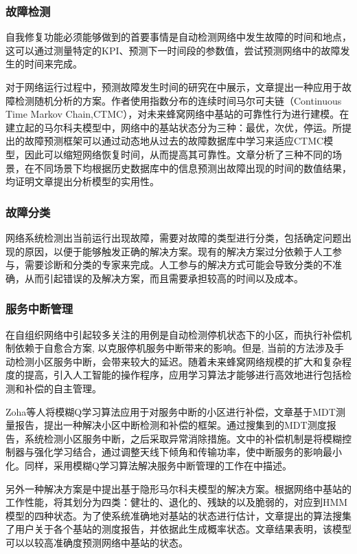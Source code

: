 \documentclass{IEEEtran}
\begin{document}
\subsubsection{故障检测}
自我修复功能必须能够做到的首要事情是自动检测网络中发生故障的时间和地点，这可以通过测量特定的KPI、预测下一时间段的参数值，尝试预测网络中的故障发生的时间来完成。

对于网络运行过程中，预测故障发生时间的研究在\cite{Farooq2015}中展示，文章提出一种应用于故障检测随机分析的方案。作者使用指数分布的连续时间马尔可夫链（Continuous Time Markov Chain,CTMC），对未来蜂窝网络中基站的可靠性行为进行建模。在建立起的马尔科夫模型中，网络中的基站状态分为三种：最优，次优，停运。所提出的故障预测框架可以通过动态地从过去的故障数据库中学习来适应CTMC模型，因此可以缩短网络恢复时间，从而提高其可靠性。文章分析了三种不同的场景，在不同场景下均根据历史数据库中的信息预测出故障出现的时间的数值结果，均证明文章提出分析模型的实用性。

\subsubsection{故障分类}

网络系统检测出当前运行出现故障，需要对故障的类型进行分类，包括确定问题出现的原因，以便于能够触发正确的解决方案。现有的解决方案过分依赖于人工参与，需要诊断和分类的专家来完成。人工参与的解决方式可能会导致分类的不准确，从而引起错误的及解决方案，而且需要承担较高的时间以及成本。


\subsubsection{服务中断管理}

在自组织网络中引起较多关注的用例是自动检测停机状态下的小区，而执行补偿机制依赖于自愈合方案, 以克服停机服务中断带来的影响。但是, 当前的方法涉及手动检测小区服务中断，会带来较大的延迟。随着未来蜂窝网络规模的扩大和复杂程度的提高，引入人工智能的操作程序，应用学习算法才能够进行高效地进行包括检测和补偿的自主管理。

Zoha等人\cite{Zoha2016}将模糊Q学习算法应用于对服务中断的小区进行补偿，文章基于MDT测量报告，提出一种解决小区中断检测和补偿的框架。通过搜集到的MDT测度报告，系统检测小区服务中断，之后采取异常消除措施。文中的补偿机制是将模糊控制器与强化学习结合，通过调整天线下倾角和传输功率，使中断服务的影响最小化。同样，采用模糊Q学习算法解决服务中断管理的工作在\cite{Razavi2010}\cite{Razavi2010a}\cite{Islam2012}中描述。

另外一种解决方案是\cite{Alias2016}中提出基于隐形马尔科夫模型的解决方案。根据网络中基站的工作性能，将其划分为四类：健壮的、退化的、残缺的以及脆弱的，对应到HMM模型的四种状态。为了使系统准确地对基站的状态进行估计，文章提出的算法搜集了用户关于各个基站的测度报告，并依据此生成概率状态。文章结果表明，该模型可以以较高准确度预测网络中基站的状态。
\end{document}
